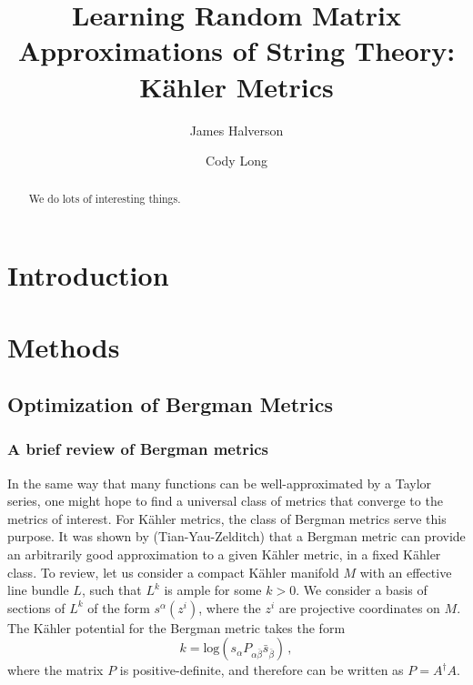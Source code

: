 \documentclass[12pt,a4paper]{article}
\title{\textbf{Learning Random Matrix Approximations of String Theory: K\" ahler Metrics}}
\author[]{James Halverson}
\author[]{Cody Long}
\date{}
\affil[]{Department of Physics, Northeastern University\\Boston, MA 02115, USA}
\begin{document}
\maketitle


\vspace{1cm}

\begin{abstract}
We do lots of interesting things.
 \end{abstract}

\clearpage


\tableofcontents



\section{Introduction}

\section{Methods}
\subsection{Optimization of Bergman Metrics}
\subsubsection{A brief review of Bergman metrics}
In the same way that many functions can be well-approximated by a Taylor series,
 one might hope to find a universal class of metrics that converge to the metrics of interest.
For K\"ahler metrics, the class of Bergman metrics serve this purpose. It was shown by
(Tian-Yau-Zelditch) that a Bergman metric can provide an arbitrarily good approximation to
a given K\"ahler metric, in a fixed K\"ahler class. To review, let us consider a compact K\"ahler
manifold $M$ with an effective line bundle $L$, such that $L^k$ is ample for some $k > 0$. 
We consider a basis of sections of $L^k$ of the form $s^\alpha (z^i)$, where the $z^i$ are 
projective coordinates on $M$. The K\"ahler potential for the Bergman metric takes the form
\begin{equation}
k = \mathrm{log}(s_\alpha P_{\alpha \bar{\beta}} \bar{s}_{\bar{\beta}})\, , 
\end{equation}
where the matrix $P$ is positive-definite, and therefore can be written as $P = A^\dagger A$. 
\end{document}
